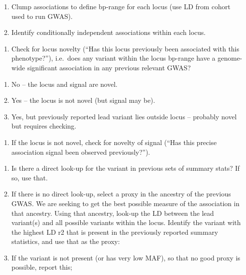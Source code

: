 \documentclass[
]{book}
\providecommand{\tightlist}{%
  \setlength{\itemsep}{0pt}\setlength{\parskip}{0pt}}
\begin{document}
\begin{enumerate}
\def\labelenumi{(\alph{enumi})}
\tightlist
\item
  Clump associations to define bp-range for each locus (use LD from cohort used to run GWAS).
\item
  Identify conditionally independent associations within each locus.
\end{enumerate}

\begin{enumerate}
\def\labelenumi{\arabic{enumi}.}
\setcounter{enumi}{1}
\tightlist
\item
  Check for locus novelty (``Has this locus previously been associated with this phenotype?''), i.e.~does any variant within the locus bp-range have a genome-wide significant association in any previous relevant GWAS?
\end{enumerate}

\begin{enumerate}
\def\labelenumi{(\alph{enumi})}
\tightlist
\item
  No -- the locus and signal are novel.
\item
  Yes -- the locus is not novel (but signal may be).
\item
  Yes, but previously reported lead variant lies outside locus -- probably novel but requires checking.
\end{enumerate}

\begin{enumerate}
\def\labelenumi{\arabic{enumi}.}
\setcounter{enumi}{2}
\tightlist
\item
  If the locus is not novel, check for novelty of signal (``Has this precise association signal been observed previously?'').
\end{enumerate}

\begin{enumerate}
\def\labelenumi{(\alph{enumi})}
\tightlist
\item
  Is there a direct look-up for the variant in previous sets of summary stats? If so, use that.
\item
  If there is no direct look-up, select a proxy in the ancestry of the previous GWAS. We are seeking to get the best possible measure of the association in that ancestry.
  Using that ancestry, look-up the LD between the lead variant(s) and all possible variants within the locus. Identify the variant with the highest LD r2 that is present in the previously reported summary statistics, and use that as the proxy:
\item
  If the variant is not present (or has very low MAF), so that no good proxy is possible, report this;
\end{enumerate}
\end{document}
